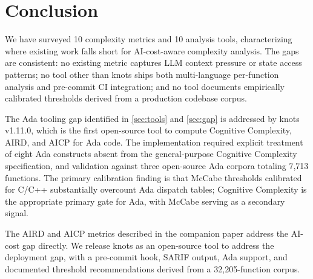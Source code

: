 \documentclass[10pt,twocolumn,letterpaper]{article}
\begin{document}
\section{Conclusion}
\label{sec:conclusion}

We have surveyed 10 complexity metrics and 10 analysis tools, characterizing
where existing work falls short for AI-cost-aware complexity analysis.  The
gaps are consistent: no existing metric captures LLM context pressure or
state access patterns; no tool other than knots ships both multi-language
per-function analysis and pre-commit CI integration; and no tool documents
empirically calibrated thresholds derived from a production codebase corpus.

The Ada tooling gap identified in \cref{sec:tools} and \cref{sec:gap} is addressed by
knots v1.11.0, which is the first open-source tool to compute Cognitive
Complexity, AIRD, and AICP for Ada code.  The implementation required
explicit treatment of eight Ada constructs absent from the general-purpose
Cognitive Complexity specification, and validation against three open-source
Ada corpora totaling 7,713 functions.  The primary calibration finding is
that McCabe thresholds calibrated for C/C++ substantially overcount Ada
dispatch tables; Cognitive Complexity is the appropriate primary gate for
Ada, with McCabe serving as a secondary signal.

The AIRD and AICP metrics described in the companion paper address the
AI-cost gap directly.  We release knots as an open-source tool to address
the deployment gap, with a pre-commit hook, SARIF output, Ada support, and
documented threshold recommendations derived from a 32,205-function corpus.


\end{document}
